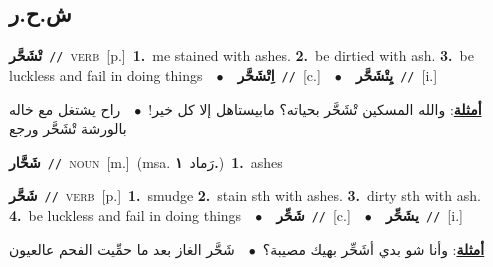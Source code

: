 \documentclass[10pt,a4paper,twoside]{article} %
\begin{document}
\begin{multicols}{2}
\vspace{-3mm}
\subsection*{\color{blue}\foreignlanguage{arabic}{ش.ح.ر}\color{blue}{}} 

{\setlength\topsep{0pt}\textbf{\foreignlanguage{arabic}{تْشَحَّر}}\ {\color{gray}\texttt{//}\color{black}}\ \textsc{verb}\ [p.]\ \textbf{1.}~me stained with ashes.  \textbf{2.}~be dirtied with ash.  \textbf{3.}~be luckless and fail in doing things\ \ $\bullet$\ \ \setlength\topsep{0pt}\textbf{\foreignlanguage{arabic}{اِتْشَحَّر}}\ {\color{gray}\texttt{//}\color{black}}\ [c.]\ \ $\bullet$\ \ \setlength\topsep{0pt}\textbf{\foreignlanguage{arabic}{يِتْشَحَّر}}\ {\color{gray}\texttt{//}\color{black}}\ [i.]\  \begin{flushright}\color{gray}\foreignlanguage{arabic}{\textbf{\underline{\foreignlanguage{arabic}{أمثلة}}}: والله المسكين تْشَحَّر بحياته؟ مابيستاهل إلا كل خير!\ $\bullet$\ \  راح يشتغل مع خاله بالورشة تْشَحَّر ورجع}\end{flushright}\color{black}} \vspace{2mm}

{\setlength\topsep{0pt}\textbf{\foreignlanguage{arabic}{شَحَّار}}\ {\color{gray}\texttt{//}\color{black}}\ \textsc{noun}\ [m.]\ \color{gray}(msa. \foreignlanguage{arabic}{رَماد}~\foreignlanguage{arabic}{\textbf{١.}})\color{black}\ \textbf{1.}~ashes\ } \vspace{2mm}

{\setlength\topsep{0pt}\textbf{\foreignlanguage{arabic}{شَحَّر}}\ {\color{gray}\texttt{//}\color{black}}\ \textsc{verb}\ [p.]\ \textbf{1.}~smudge  \textbf{2.}~stain sth with ashes.  \textbf{3.}~dirty sth with ash.  \textbf{4.}~be luckless and fail in doing things\ \ $\bullet$\ \ \setlength\topsep{0pt}\textbf{\foreignlanguage{arabic}{شَحِّر}}\ {\color{gray}\texttt{//}\color{black}}\ [c.]\ \ $\bullet$\ \ \setlength\topsep{0pt}\textbf{\foreignlanguage{arabic}{يشَحِّر}}\ {\color{gray}\texttt{//}\color{black}}\ [i.]\  \begin{flushright}\color{gray}\foreignlanguage{arabic}{\textbf{\underline{\foreignlanguage{arabic}{أمثلة}}}: وأنا شو بدي أشَحِّر بهيك مصيبة؟\ $\bullet$\ \  شَحَّر الغاز بعد ما حمِّيت الفحم عالعيون}\end{flushright}\color{black}} \vspace{2mm}


\end{multicols}
\end{document}
